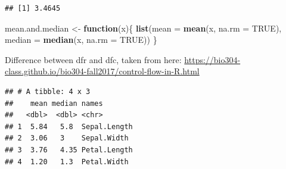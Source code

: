 \documentclass[]{book}
\newenvironment{Shaded}{\begin{snugshade}}{\end{snugshade}}
\newcommand{\ControlFlowTok}[1]{\textcolor[rgb]{0.13,0.29,0.53}{\textbf{#1}}}
\newcommand{\DataTypeTok}[1]{\textcolor[rgb]{0.13,0.29,0.53}{#1}}
\newcommand{\KeywordTok}[1]{\textcolor[rgb]{0.13,0.29,0.53}{\textbf{#1}}}
\newcommand{\NormalTok}[1]{#1}
\newcommand{\OperatorTok}[1]{\textcolor[rgb]{0.81,0.36,0.00}{\textbf{#1}}}
\newcommand{\OtherTok}[1]{\textcolor[rgb]{0.56,0.35,0.01}{#1}}
\newcommand{\StringTok}[1]{\textcolor[rgb]{0.31,0.60,0.02}{#1}}
\theoremstyle{definition}
\theoremstyle{definition}
\theoremstyle{definition}
\theoremstyle{remark}
\begin{document}
\begin{verbatim}
## [1] 3.4645
\end{verbatim}

\begin{Shaded}
\begin{Highlighting}[]
\NormalTok{mean.and.median <-}\StringTok{ }\ControlFlowTok{function}\NormalTok{(x)\{}
  \KeywordTok{list}\NormalTok{(}\DataTypeTok{mean =} \KeywordTok{mean}\NormalTok{(x, }\DataTypeTok{na.rm =} \OtherTok{TRUE}\NormalTok{), }
       \DataTypeTok{median =} \KeywordTok{median}\NormalTok{(x, }\DataTypeTok{na.rm =} \OtherTok{TRUE}\NormalTok{))}
\NormalTok{\}}
\end{Highlighting}
\end{Shaded}

Difference between dfr and dfc, taken from here:
\url{https://bio304-class.github.io/bio304-fall2017/control-flow-in-R.html}

\begin{Shaded}
\end{Shaded}

\begin{verbatim}
## # A tibble: 4 x 3
##    mean median names       
##   <dbl>  <dbl> <chr>       
## 1  5.84   5.8  Sepal.Length
## 2  3.06   3    Sepal.Width 
## 3  3.76   4.35 Petal.Length
## 4  1.20   1.3  Petal.Width
\end{verbatim}

\begin{Shaded}
\end{Shaded}
\end{document}
